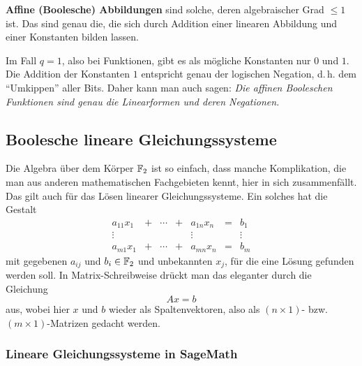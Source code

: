 \begin{refsegment}
\textbf{Affine (Boolesche) Abbildungen} sind solche, deren algebraischer Grad
$\leq 1$ ist. Das sind genau die, die sich durch Addition einer linearen
Abbildung und einer Konstanten bilden lassen.

Im Fall $q = 1$, also bei Funktionen, gibt es als mögliche Konstanten nur $0$
und $1$. Die Addition der Konstanten $1$ entspricht genau der logischen
Negation, d.\,h. dem "`Umkippen"' aller Bits. Daher kann man auch sagen:
{\em Die affinen Booleschen Funktionen sind genau die Linearformen und
deren Negationen.}

\subsection{Boolesche lineare Gleichungssysteme}\label{ss-bool-lgl}

Die Algebra über dem Körper $\mathbb{F}_2$ ist so einfach, dass manche Komplikation,
die man aus anderen mathematischen Fachgebieten kennt, hier in sich zusammenfällt.
Das gilt auch für das Lösen linearer
Gleichungssysteme.
Ein solches hat die Gestalt
\[
\begin{matrix}
     a_{11} x_1 & + & \cdots & + & a_{1n} x_n & = & b_1 \\
     \vdots     &   &        &   & \vdots     &   & \vdots \\
     a_{m1} x_1 & + & \cdots & + & a_{mn} x_n & = & b_m
\end{matrix}
\]
mit gegebenen $a_{ij}$ und $b_i \in \mathbb{F}_2$ und unbekannten $x_j$, für
die eine Lösung gefunden werden soll. In Matrix-Schreibweise drückt
man das eleganter durch die Gleichung
\[
     A x = b
\]
aus, wobei hier $x$ und $b$ wieder als Spaltenvektoren, also als
$(n \times 1)$- bzw. $(m \times 1)$-Matrizen gedacht werden.

\subsubsection*{Lineare Gleichungssysteme in SageMath}


\end{refsegment}
